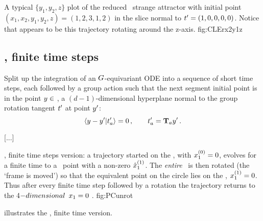 {{    }%

{}{
A typical $\{y_1,y_2,z\}$ plot of the reduced \cLf\ strange attractor
with initial point
$(x_1, x_2, y_1, y_2, z) = (1, 2, 3, 1, 2)$ in the slice normal to $t'_{}=(1,0,0,0,0)$. Notice that  appears to be this trajectory rotating around the z-axis.
    }{fig:CLErx2y1z}


	\ifarticle
	\else
	
\subsection{\Mslices, finite time steps}
\label{sect:MovFrame}


Split up the integration of an $G$-equivariant ODE into
a sequence of short time steps, each followed by a group action
such that the next segment initial point is in the point
$y \in$ {\slice}, a $(d\!-\!1)$-dimensional hyperplane
normal to the group rotation tangent $t'_{}$ at point
${y'}$:
\[ %
\dotProd{\sspRed - \slicep}{\sliceTan{a}}=0
    \,,\qquad
\sliceTan{a} = \Lg_a \slicep
\,.
\] %

[...]

{}{
{\Mslices}, finite time steps version: a
trajectory started on the \slice, with $x_1^{(0)}
=0$, evolves for a finite time to a \statesp\ point with a
non-zero $\hat{x}_1^{(1)}$. The {\em entire} \statesp\ is then
rotated (the `frame is moved') so that the equivalent point
on the circle lies on the \slice, $x_1^{(1)} =0$.
Thus after every finite time step followed by a rotation the
trajectory returns to the 4$-dimensional$ $x_1 =0$
\reducedsp.
}
{fig:PCunrot}

 illustrates the {\mslices},
finite time version.

}
